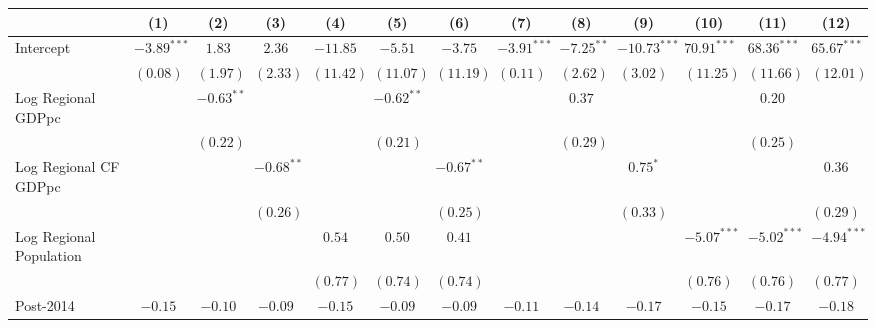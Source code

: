 
\begin{table}
\begin{center}
\begin{tiny}
\begin{tabular}{l c c c c c c c c c c c c}
\hline
 & (1) & (2) & (3) & (4) & (5) & (6) & (7) & (8) & (9) & (10) & (11) & (12) \\
\hline
Intercept                   & $-3.89^{***}$ & $1.83$        & $2.36$        & $-11.85$     & $-5.51$      & $-3.75$      & $-3.91^{***}$ & $-7.25^{**}$  & $-10.73^{***}$ & $70.91^{***}$ & $68.36^{***}$ & $65.67^{***}$ \\
                            & $(0.08)$      & $(1.97)$      & $(2.33)$      & $(11.42)$    & $(11.07)$    & $(11.19)$    & $(0.11)$      & $(2.62)$      & $(3.02)$       & $(11.25)$     & $(11.66)$     & $(12.01)$     \\
Log Regional GDPpc          &               & $-0.63^{**}$  &               &              & $-0.62^{**}$ &              &               & $0.37$        &                &               & $0.20$        &               \\
                            &               & $(0.22)$      &               &              & $(0.21)$     &              &               & $(0.29)$      &                &               & $(0.25)$      &               \\
Log Regional CF GDPpc       &               &               & $-0.68^{**}$  &              &              & $-0.67^{**}$ &               &               & $0.75^{*}$     &               &               & $0.36$        \\
                            &               &               & $(0.26)$      &              &              & $(0.25)$     &               &               & $(0.33)$       &               &               & $(0.29)$      \\
Log Regional Population     &               &               &               & $0.54$       & $0.50$       & $0.41$       &               &               &                & $-5.07^{***}$ & $-5.02^{***}$ & $-4.94^{***}$ \\
                            &               &               &               & $(0.77)$     & $(0.74)$     & $(0.74)$     &               &               &                & $(0.76)$      & $(0.76)$      & $(0.77)$      \\
Post-2014                   & $-0.15$       & $-0.10$       & $-0.09$       & $-0.15$      & $-0.09$      & $-0.09$      & $-0.11$       & $-0.14$       & $-0.17$        & $-0.15$       & $-0.17$       & $-0.18$       \\

\end{tabular}
\end{tiny}
\end{center}
\end{table}
